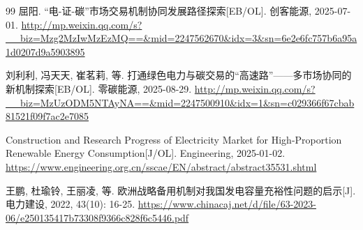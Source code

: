 \documentclass[a4paper,11pt,AutoFakeBold]{article}
\begin{document}
\begin{thebibliography}{99}
  屈阳. “电-证-碳”市场交易机制协同发展路径探索[EB/OL]. 创客能源, 2025-07-01.
  \url{http://mp.weixin.qq.com/s?__biz=Mzg2MzIwMzEzMQ==&mid=2247562670&idx=3&sn=6e2e6fc757b6a95a1d0207d9a5903895}

  刘利利, 冯天天, 崔茗莉, 等. 打通绿色电力与碳交易的“高速路”——多市场协同的新机制探索[EB/OL]. 零碳能源, 2025-08-29.
  \url{http://mp.weixin.qq.com/s?__biz=MzUzODM5NTAyNA==&mid=2247500910&idx=1&sn=c029366f67cbab81521f09f7ac2e7085}

  Construction and Research Progress of Electricity Market for High-Proportion Renewable Energy Consumption[J/OL]. Engineering, 2025-01-02.
  \url{https://www.engineering.org.cn/sscae/EN/abstract/abstract35531.shtml}

  王鹏, 杜瑜铃, 王丽凌, 等. 欧洲战略备用机制对我国发电容量充裕性问题的启示[J]. 电力建设, 2022, 43(10): 16-25.
  \url{https://www.chinacaj.net/d/file/63-2023-06/e250135417b73308f9366c828f6c5446.pdf}
\end{thebibliography}
\end{document}

